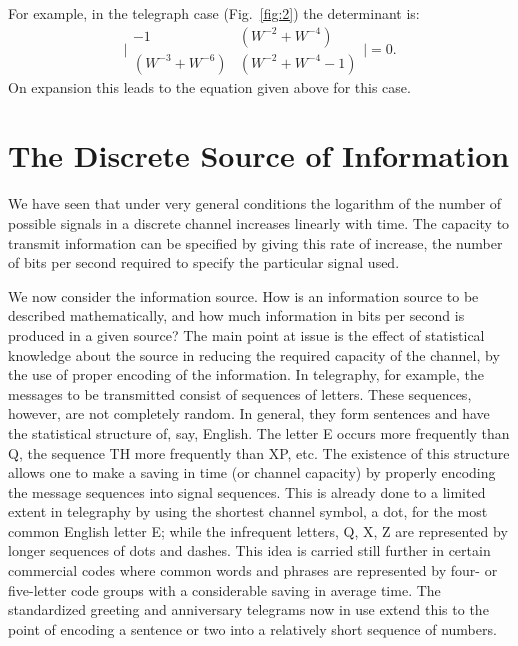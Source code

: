 For example, in the telegraph case (Fig.~\ref{fig:2}) the determinant is:
$$
\biggl| \begin{matrix}
-1 & (W^{-2} + W^{-4}) \\
(W^{-3} + W^{-6}) & (W^{-2} + W^{-4} -1 )
\end{matrix} \biggr| = 0.
$$
On expansion this leads to the equation given above for this
case.

\section{The Discrete Source of Information}

We have seen that under very general conditions the logarithm of the
number of possible signals in a discrete channel increases linearly
with time.  The capacity to transmit information can be specified by
giving this rate of increase, the number of bits per second required to
specify the particular signal used.

We now consider the information source.  How is an information source
to be described mathematically, and how much information in bits per
second is produced in a given source?  The main point at issue is the
effect of statistical knowledge about the source in reducing the required
capacity of the channel, by the use of proper encoding of the information.
In telegraphy, for example, the messages to be transmitted consist of
sequences of letters.  These sequences, however, are not completely
random.  In general, they form sentences and have the statistical
structure of, say, English.  The letter E occurs more frequently than Q,
the sequence TH more frequently than XP, etc.  The existence of this
structure allows one to make a saving in time (or channel capacity)
by properly encoding the message sequences into signal sequences.
This is already done to a limited extent in telegraphy by using the
shortest channel symbol, a dot, for the most common English letter E;
while the infrequent letters, Q, X, Z are represented by longer sequences
of dots and dashes.  This idea is carried still further in certain
commercial codes where common words and phrases are represented by four-
or five-letter code groups with a considerable saving in average time.
The standardized greeting and anniversary telegrams now in use extend
this to the point of encoding a sentence or two into a relatively short
sequence of numbers.

